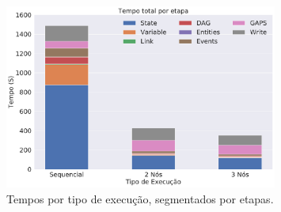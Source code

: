 \begin{figure}[ht]
\centerline{
\includegraphics[width=0.8\textwidth]{./img/total_step.pdf}}
 \caption{Tempos por tipo de execução, segmentados por etapas.}
 \label{fig:total_step}
\end{figure}

